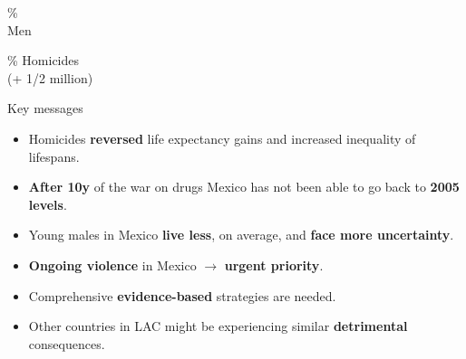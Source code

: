 \documentclass[xcolor={dvipsnames}]{beamer}
\begin{document}
\begin{frame}
\Huge{
\begin{center}
{\fontsize{70}{80}\%}\\
Men

\end{center}
}
\end{frame}


\begin{frame}
\Huge{
\begin{center}
{\fontsize{70}{80}\% Homicides}\\
(+ 1/2 million)

\end{center}
}
\end{frame}


\begin{frame}
\Large{
Key messages \pause

		\begin{itemize}
		
		\item Homicides \textbf{reversed} life expectancy gains and increased inequality of lifespans. \pause

		\item \textbf{After 10y} of the war on drugs Mexico has not been able to go back to \textbf{2005 levels}. \pause
		
		\item Young males in Mexico \textbf{live less}, on average, and \textbf{face more uncertainty}.\pause
		
		\item \textbf{Ongoing violence} in Mexico $\longrightarrow$ \textbf{urgent priority}. \pause
		
		 \item Comprehensive \textbf{evidence-based} strategies are needed.\pause
		
		\item Other countries in LAC might be experiencing similar \textbf{detrimental} consequences.
						
		\end{itemize}

}
\end{frame}






\end{document}
